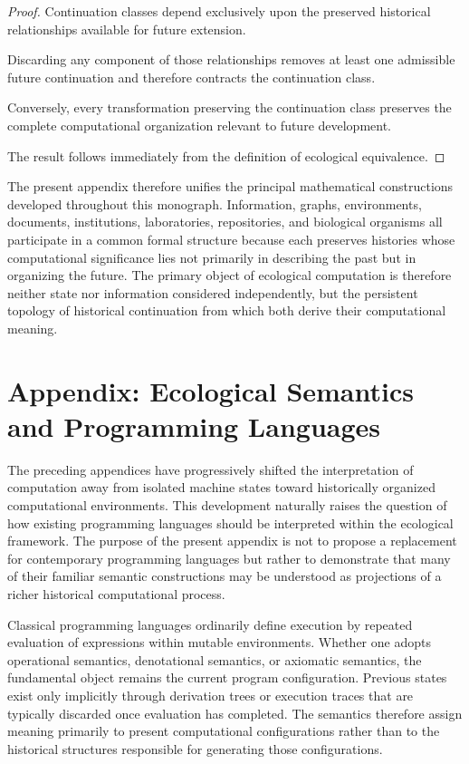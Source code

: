 \documentclass[12pt,oneside]{article}
\theoremstyle{remark}
\begin{document}
\begin{proof}

Continuation classes depend exclusively upon the preserved historical
relationships available for future extension.

Discarding any component of those relationships removes at least one admissible
future continuation and therefore contracts the continuation class.

Conversely, every transformation preserving the continuation class preserves
the complete computational organization relevant to future development.

The result follows immediately from the definition of ecological equivalence.

\end{proof}

The present appendix therefore unifies the principal mathematical constructions
developed throughout this monograph. Information, graphs, environments,
documents, institutions, laboratories, repositories, and biological organisms
all participate in a common formal structure because each preserves histories
whose computational significance lies not primarily in describing the past but
in organizing the future. The primary object of ecological computation is
therefore neither state nor information considered independently, but the
persistent topology of historical continuation from which both derive their
computational meaning.

\section{Appendix: Ecological Semantics and Programming Languages}

The preceding appendices have progressively shifted the interpretation of
computation away from isolated machine states toward historically organized
computational environments. This development naturally raises the question of
how existing programming languages should be interpreted within the ecological
framework. The purpose of the present appendix is not to propose a replacement
for contemporary programming languages but rather to demonstrate that many of
their familiar semantic constructions may be understood as projections of a
richer historical computational process.

Classical programming languages ordinarily define execution by repeated
evaluation of expressions within mutable environments. Whether one adopts
operational semantics, denotational semantics, or axiomatic semantics, the
fundamental object remains the current program configuration. Previous states
exist only implicitly through derivation trees or execution traces that are
typically discarded once evaluation has completed. The semantics therefore
assign meaning primarily to present computational configurations rather than to
the historical structures responsible for generating those configurations.
\end{document}
